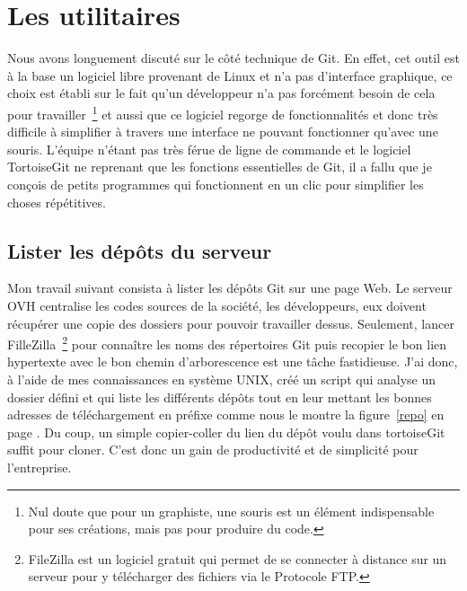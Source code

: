 \section{Les utilitaires} %
\label{sec:Les utilitaires}

Nous avons longuement discuté sur le côté technique de Git. En effet,
cet outil est à la base un logiciel libre provenant de Linux et n'a pas
d'interface graphique, ce choix est établi sur le fait qu'un développeur
n'a pas forcément besoin de cela pour travailler\, \footnote{Nul doute
que pour un graphiste, une souris est un élément indispensable pour ses
créations, mais pas pour produire du code.} et aussi que ce logiciel
regorge de fonctionnalités et donc très difficile à simplifier à travers
une interface ne pouvant fonctionner qu'avec une souris.  L'équipe
n'étant pas très férue de ligne de commande et le logiciel TortoiseGit
ne reprenant que les fonctions essentielles de Git, il a fallu que je
conçois de petits programmes qui fonctionnent en un clic pour simplifier
les choses répétitives.

\subsection{Lister les dépôts du serveur} %
\label{sub:Lister les dépôts du serveur}

Mon travail suivant consista à lister les dépôts Git sur une page Web.
Le serveur OVH centralise les codes sources de la société, les
développeurs, eux doivent récupérer une copie des dossiers pour pouvoir
travailler dessus. Seulement, lancer FilleZilla\, \footnote{FileZilla
est un logiciel gratuit qui permet de se connecter à distance sur un
serveur pour y télécharger des fichiers via le Protocole FTP.} pour
connaître les noms des répertoires Git puis recopier le bon lien
hypertexte avec le bon chemin d'arborescence est une tâche fastidieuse.
J'ai donc, à l'aide de mes connaissances en système UNIX, créé un script
qui analyse un dossier défini et qui liste les différents dépôts tout en
leur mettant les bonnes adresses de téléchargement en préfixe comme nous
le montre la figure~\ref{repo} en page \pageref{repo}. Du coup, un
simple copier-coller du lien du dépôt voulu dans tortoiseGit suffit pour
cloner. C'est donc un gain de productivité et de simplicité pour
l'entreprise.


